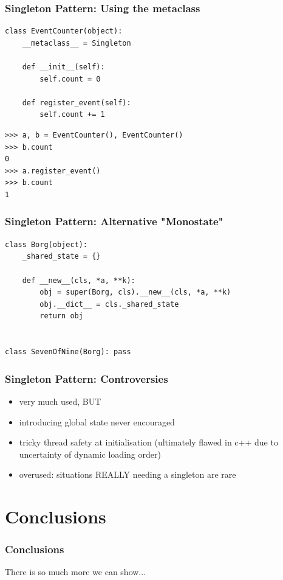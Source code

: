 \documentclass{beamer}
\begin{document}
\begin{frame}[fragile]
\frametitle{Singleton Pattern: Using the metaclass}
\begin{verbatim}
class EventCounter(object):
    __metaclass__ = Singleton

    def __init__(self):
        self.count = 0

    def register_event(self):
        self.count += 1
\end{verbatim}

\begin{small}
\begin{verbatim}
>>> a, b = EventCounter(), EventCounter()
>>> b.count
0
>>> a.register_event()
>>> b.count
1
\end{verbatim}
\end{small}
\end{frame}

\begin{frame}[fragile]
\frametitle{Singleton Pattern: Alternative "Monostate"}
\begin{verbatim}
class Borg(object):
    _shared_state = {}

    def __new__(cls, *a, **k):
        obj = super(Borg, cls).__new__(cls, *a, **k)
        obj.__dict__ = cls._shared_state
        return obj


class SevenOfNine(Borg): pass
\end{verbatim}
\end{frame}

\begin{frame}
\frametitle{Singleton Pattern: Controversies}
\begin{itemize}
 \item very much used, BUT
 \item introducing global state never encouraged
 \item tricky thread safety at initialisation (ultimately flawed in c++ due to uncertainty of dynamic loading order)
 \item overused: situations REALLY needing a singleton are rare
\end{itemize}
\end{frame} 

\section{Conclusions}
\begin{frame}
\frametitle{Conclusions}


There is so much more we can show...
 
\end{frame}
\end{document}
